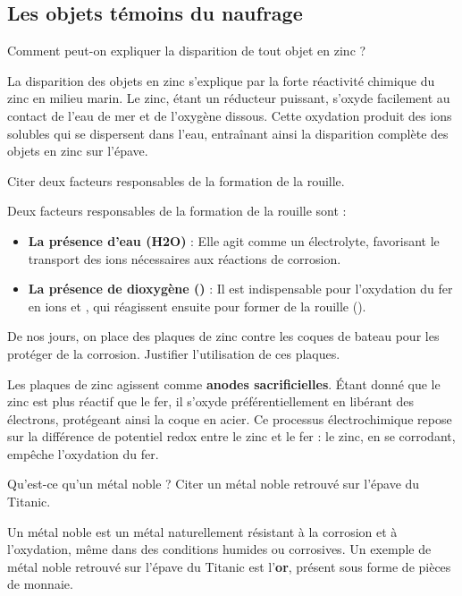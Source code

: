\documentclass[answers]{exam}
\begin{document}
\subsection*{Les objets témoins du naufrage}

\begin{questions}
  \question[0.5] Comment peut-on expliquer la disparition de tout objet en zinc ?
  \begin{solution}
  La disparition des objets en zinc s'explique par la forte réactivité chimique du zinc en milieu marin. Le zinc, étant un réducteur puissant, s'oxyde facilement au contact de l'eau de mer et de l'oxygène dissous. Cette oxydation produit des ions  solubles qui se dispersent dans l'eau, entraînant ainsi la disparition complète des objets en zinc sur l'épave.
  \end{solution}

  \question[1] Citer deux facteurs responsables de la formation de la rouille.
  \begin{solution}
  Deux facteurs responsables de la formation de la rouille sont :
  \begin{itemize}
    \item \textbf{La présence d'eau (H2O)} : Elle agit comme un électrolyte, favorisant le transport des ions nécessaires aux réactions de corrosion.
    \item \textbf{La présence de dioxygène ()} : Il est indispensable pour l'oxydation du fer en ions  et , qui réagissent ensuite pour former de la rouille ().
  \end{itemize}
  \end{solution}

  \question[0.5] De nos jours, on place des plaques de zinc contre les coques de bateau pour les protéger de la corrosion. Justifier l'utilisation de ces plaques.
  \begin{solution}
  Les plaques de zinc agissent comme \textbf{anodes sacrificielles}. Étant donné que le zinc est plus réactif que le fer, il s'oxyde préférentiellement en libérant des électrons, protégeant ainsi la coque en acier. Ce processus électrochimique repose sur la différence de potentiel redox entre le zinc et le fer : le zinc, en se corrodant, empêche l'oxydation du fer.
  \end{solution}

  \question[0.5] Qu'est-ce qu'un métal noble ? Citer un métal noble retrouvé sur l'épave du Titanic.
  \begin{solution}
  Un métal noble est un métal naturellement résistant à la corrosion et à l'oxydation, même dans des conditions humides ou corrosives. Un exemple de métal noble retrouvé sur l'épave du Titanic est l'\textbf{or}, présent sous forme de pièces de monnaie.
  \end{solution}


\end{questions}
\end{document}

